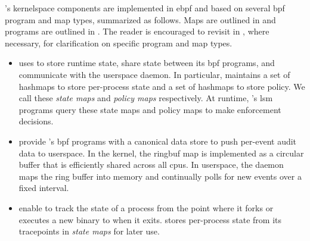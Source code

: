 \bpfbox{}'s kernelspace components are implemented in \gls{ebpf} and based on several
\gls{bpf} program and map types, summarized as follows. Maps are outlined in
\textbf{} and programs are outlined in \textbf{}. The reader
is encouraged to revisit  in ,
where necessary, for clarification on specific program and map types.

\begin{itemize}
  \item \bpfbox{} uses \textbf{} to store runtime state, share state
  between its \gls{bpf} programs, and communicate with the userspace daemon. In
  particular, \bpfbox{} maintains a set of hashmaps to store per-process state and a set
  of hashmaps to store policy. We call these \textit{state maps} and \textit{policy maps}
  respectively.  At runtime, \bpfbox{}'s \gls{lsm} programs query these state maps and
  policy maps to make enforcement decisions.

  \item \textbf{} provide \bpfbox{}'s \gls{bpf} programs with a canonical
  data store to push per-event audit data to userspace. In the kernel, the ringbuf map is
  implemented as a circular buffer that is efficiently shared across all \glspl{cpu}.
  In userspace, the \bpfbox{} daemon maps the ring buffer into memory and continually
  polls for new events over a fixed interval.


  \item \textbf{} enable \bpfbox{} to track the state of a process from the
  point where it forks or executes a new binary to when it exits. \bpfbox{} stores
  per-process state from its tracepoints in \textit{state maps} for later use.


\end{itemize}
